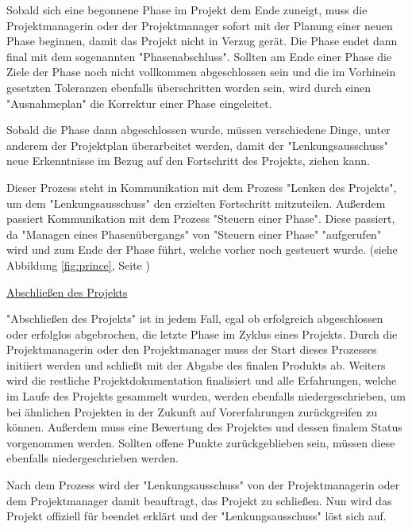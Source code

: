 Sobald sich eine begonnene Phase im Projekt dem Ende zuneigt, muss die Projektmanagerin oder der Projektmanager sofort mit der Planung einer neuen Phase beginnen, damit das Projekt nicht in Verzug gerät. Die Phase endet dann final mit dem sogenannten "Phasenabschluss". Sollten am Ende einer Phase die Ziele der Phase noch nicht vollkommen abgeschlossen sein und die im Vorhinein gesetzten Toleranzen ebenfalls überschritten worden sein, wird durch einen "Ausnahmeplan" die Korrektur einer Phase eingeleitet. \cite{Prince2}

Sobald die Phase dann abgeschlossen wurde, müssen verschiedene Dinge, unter anderem der Projektplan überarbeitet werden, damit der "Lenkungsausschuss" neue Erkenntnisse im Bezug auf den Fortschritt des Projekts, ziehen kann. \cite{Prince2}

Dieser Prozess steht in Kommunikation mit dem Prozess "Lenken des Projekts", um dem "Lenkungsausschuss" den erzielten Fortschritt mitzuteilen. Außerdem passiert Kommunikation mit dem Prozess "Steuern einer Phase". Diese passiert, da "Managen eines Phasenübergangs" von "Steuern einer Phase" "aufgerufen" wird und zum Ende der Phase führt, welche vorher noch gesteuert wurde. (siehe Abbildung \ref{fig:prince}, Seite \pageref{fig:prince}) \cite{Prince2}

\underline{Abschließen des Projekts}

"Abschließen des Projekts" ist in jedem Fall, egal ob erfolgreich abgeschlossen oder erfolglos abgebrochen, die letzte Phase im Zyklus eines Projekts. Durch die Projektmanagerin oder den Projektmanager muss der Start dieses Prozesses initiiert werden und schließt mit der Abgabe des finalen Produkts ab. Weiters wird die restliche Projektdokumentation finalisiert und alle Erfahrungen, welche im Laufe des Projekts gesammelt wurden, werden ebenfalls niedergeschrieben, um bei ähnlichen Projekten in der Zukunft auf Vorerfahrungen zurückgreifen zu können. Außerdem muss eine Bewertung des Projektes und dessen finalem Status vorgenommen werden. Sollten offene Punkte zurückgeblieben sein, müssen diese ebenfalls niedergeschrieben werden. \cite{Prince2}

Nach dem Prozess wird der "Lenkungsausschuss" von der Projektmanagerin oder dem Projektmanager damit beauftragt, das Projekt zu schließen. Nun wird das Projekt offiziell für beendet erklärt und der "Lenkungsausschuss" löst sich auf. \cite{Prince2}
